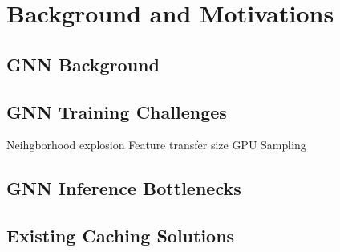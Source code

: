 \chapter{Background and Motivations}

\section{GNN Background}

\section{GNN Training Challenges}
Neihgborhood explosion
Feature transfer size
GPU Sampling


\section{GNN Inference Bottlenecks}

\section{Existing Caching Solutions}

